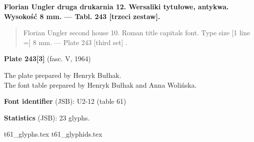 \documentclass[12pt]{article}
\newcommand{\bg}{\begingl}
\newcommand{\pismoPL}[1]{{\relsize{2}\Junicode\textbf{#1}}}
\newcommand{\pismoEN}[1]{{\relsize{1}\Junicode\begin{quote}#1\end{quote}}}
\newcommand{\plate}[3]{\textbf{Plate #1} (fasc. #2, #3)}
\newcommand{\exampleBib}[1]{{\relsize{2}\Junicode\textbf{The
      example:}\\[2ex] CATALOGUS LIBRORUM \textbf{#1}}}
\newcommand{\exampleDesc}[1]{{\relsize{0}\Junicode#1}}
\newcommand{\exampleDig}[1]{{\relsize{0}\Junicode \textbf{Digitization(s) [JSB]:} #1}}
\newcommand{\exampleLib}[1]{{\relsize{0}\Junicode \textbf{Library:} #1}}
\newcommand{\examplePL}[1]{}
\newcommand{\exampleEN}[1]{}
\newcommand{\fontID}[2]{{\relsize{1}\Junicode\textbf{Font identifier} (JSB): #1 (table #2)}}
\newcommand{\fontstat}[1]{{\relsize{1}\Junicode\textbf{Statistics} (JSB): #1 glyphs.}}
\newcommand{\exampleRef}[1]{{\relsize{0}\Junicode \textbf{References:} #1}}
\newcommand{\examplePage}[1]{{Page reference: \relsize{0}\Junicode#1}}
\begin{document}
 \newpage
 
% 

 

 \pismoPL{Florian Ungler druga drukarnia 12. Wersaliki tytułowe, antykwa. Wysokość 8 mm. — Tabl. 243 [trzeci zestaw].}
  
 \pismoEN{Florian Ungler second house 10. Roman title capitals font. Type size [1 line =] 8 mm. — Plate 243 [third set] .}

\plate{243[3]}{V}{1964}

The plate prepared by Henryk Bułhak.\\
The font table prepared by Henryk Bułhak and Anna Wolińska.

\bigskip














\bigskip

\fontID{U2-12}{61}

\fontstat{23}

  {t61_glyphs.tex}
  {t61_glyphids.tex}


\newpage
 
% 
\end{document}
